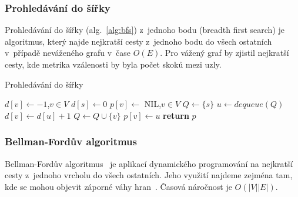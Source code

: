 \documentclass{bakalarka}
\begin{document}
\subsubsection{Prohledávání do šířky}
Prohledávání do šířky (alg.~\ref{alg:bfs}) z~jednoho bodu (breadth first
search) je algoritmus, který najde nejkratší cesty z~jednoho bodu do všech
ostatních v~případě neváženého grafu v~čase $O(E)$. Pro vážený graf by zjistil
nejkratší cesty, kde metrika vzálenosti by byla počet skoků mezi uzly.

\begin{center}
\begin{minipage}{\textwidth}
\begin{algorithm}[H]
	\caption{Prohledávání do šířky}
		\label{alg:bfs}
	\begin{algorithmic}[1]
	\Statex
		\State $d[v] \gets -1$,$v \in V$
		\State $d[s] \gets 0$
		\State $p[v] \gets $ NIL,$v \in V$
		\State $Q \gets \{s\}$
			\State $u \gets dequeue(Q)$
					\State $d[v] \gets d[u] + 1$
					\State $Q \gets Q \cup \{v\}$
					\State $p[v] \gets u$
				\EndIf
			\EndFor
		\EndWhile
		\State \textbf{return} $p$
	\EndFunction
	\end{algorithmic}
\end{algorithm}
\end{minipage}
\end{center}
\mbox{}

\subsubsection{Bellman-Fordův algoritmus}
Bellman-Fordův algoritmus~\citep{bellmanford_algorithm} je aplikací dynamického
programování na nejkratší cesty z~jednoho vrcholu do všech ostatních. Jeho
využití najdeme zejména tam, kde se mohou objevit záporné váhy
hran~\citep{CLRS}. Časová náročnost je $O(|V||E|)$.
\end{document}
